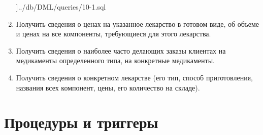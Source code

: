 \documentclass[a4paper]{article}
\begin{document}
\begin{enumerate}
				]{../db/DML/queries/10-1.sql}
				
				
			\item Получить сведения о ценах на указанное лекарство в готовом виде, об объеме и ценах на все компоненты, требующиеся для этого лекарства.
				
			\item Получить сведения о наиболее часто делающих заказы клиентах на медикаменты определенного типа, на конкретные медикаменты.
				
				
				
			\item Получить сведения о конкретном лекарстве (его тип, способ приготовления, названия всех компонент, цены, его количество на складе).
				
		\end{enumerate}
		
	\newpage
	
	\section{Процедуры и триггеры}
\end{document}

